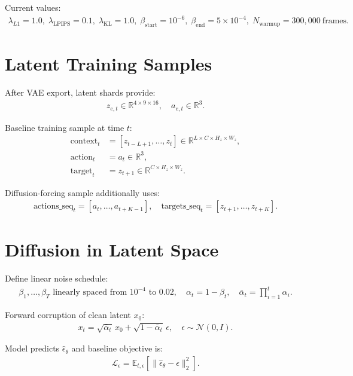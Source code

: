 \documentclass[11pt]{article}
\begin{document}
Current values:
\begin{align}
\lambda_{L1}=1.0,\;
\lambda_{\text{LPIPS}}=0.1,\;
\lambda_{\text{KL}}=1.0,\;
\beta_{\text{start}}=10^{-6},\;
\beta_{\text{end}}=5\times10^{-4},\;
N_{\text{warmup}}=300{,}000\ \text{frames}.
\end{align}

\section{Latent Training Samples}
After VAE export, latent shards provide:
\begin{align}
z_{e,t}\in \mathbb{R}^{4\times 9\times 16}, \quad
a_{e,t}\in\mathbb{R}^{3}.
\end{align}

Baseline training sample at time $t$:
\begin{align}
\text{context}_t &= [z_{t-L+1},\ldots,z_t]\in\mathbb{R}^{L\times C\times H_z\times W_z}, \\
\text{action}_t &= a_t\in\mathbb{R}^3, \\
\text{target}_t &= z_{t+1}\in\mathbb{R}^{C\times H_z\times W_z}.
\end{align}

Diffusion-forcing sample additionally uses:
\begin{align}
\text{actions\_seq}_t=[a_t,\ldots,a_{t+K-1}],\quad
\text{targets\_seq}_t=[z_{t+1},\ldots,z_{t+K}].
\end{align}

\section{Diffusion in Latent Space}
Define linear noise schedule:
\begin{align}
\beta_1,\ldots,\beta_T \text{ linearly spaced from } 10^{-4} \text{ to } 0.02,\quad
\alpha_t = 1-\beta_t,\quad
\bar{\alpha}_t = \prod_{i=1}^t \alpha_i.
\end{align}

Forward corruption of clean latent $x_0$:
\begin{align}
x_t = \sqrt{\bar{\alpha}_t}\,x_0 + \sqrt{1-\bar{\alpha}_t}\,\epsilon,\quad
\epsilon\sim\mathcal{N}(0,I).
\end{align}

Model predicts $\hat{\epsilon}_\theta$ and baseline objective is:
\begin{align}
\mathcal{L}_{\epsilon}
=
\mathbb{E}_{t,\epsilon}\left[\|\hat{\epsilon}_\theta - \epsilon\|_2^2\right].
\end{align}
\end{document}
